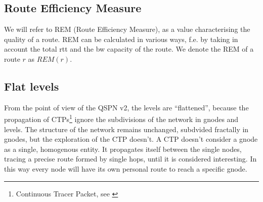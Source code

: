\documentclass[a4paper]{article}
\begin{document}
\subsection{Route Efficiency Measure}
We will refer to REM (Route Efficiency Measure), as a value characterising the
quality of a route. REM can be calculated in various ways, f.e. by taking in
account the total rtt and the bw capacity of the route.  We denote the REM of
a route $r$ as $REM(r)$.

\subsection{Flat levels}
\label{sec:flat}
From the point of view of the QSPN v2, the levels are ``flattened'', because
the propagation of CTPs\footnote{Continuous Tracer Packet, see \cite{qspndoc}} ignore the subdivisions of
the network in gnodes and levels. The structure of the network remains
unchanged, subdvided fractally in gnodes, but the exploration of the CTP
doesn't. A CTP doesn't consider a gnode as a single, homogenous entity. It propagates 
itself between the single nodes, tracing a precise route formed by single
hops, until it is considered interesting. 
In this way every node will have its own personal route to reach a specific gnode. 
\end{document}
